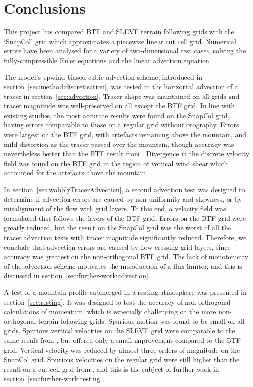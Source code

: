 \chapter{Conclusions}
\label{sec:conclusions}

This project has compared BTF and SLEVE terrain following grids with the `SnapCol' grid which approximates a piecewise linear cut cell grid.   Numerical errors have been analysed for a variety of two-dimensional test cases, solving the fully-compressible Euler equations and the linear advection equation.

The model's upwind-biased cubic advection scheme, introduced in section~\ref{sec:method:discretisation}, was tested in the horizontal advection of a tracer in section~\ref{sec:advection}.  Tracer shape was maintained on all grids and tracer magnitude was well-preserved on all except the BTF grid.  In line with existing studies, the most accurate results were found on the SnapCol grid, having errors comparable to those on a regular grid without orography.  Errors were largest on the BTF grid, with artefacts remaining above the mountain, and mild distortion as the tracer passed over the mountain, though accuracy was nevertheless better than the BTF result from \textcite{schaer2002}.  Divergence in the discrete velocity field was found on the BTF grid in the region of vertical wind shear which accounted for the artefacts above the mountain.

In section~\ref{sec:wobblyTracerAdvection}, a second advection test was designed to determine if advection errors are caused by non-uniformity and skewness, or by misalignment of the flow with grid layers.  To this end, a velocity field was formulated that follows the layers of the BTF grid.
Errors on the BTF grid were greatly reduced, but the result on the SnapCol grid was the worst of all the tracer advection tests with tracer magnitude significantly reduced.  Therefore, we conclude that advection errors are caused by flow crossing grid layers, since accuracy was greatest on the non-orthogonal BTF grid.  The lack of monotonicity of the advection scheme motivates the introduction of a flux limiter, and this is discussed in section~\ref{sec:further-work:advection}.

A test of a mountain profile submerged in a resting atmosphere was presented in section~\ref{sec:resting}.  It was designed to test the accuracy of non-orthogonal calculations of momentum, which is especially challenging on the more non-orthogonal terrain following grids.  Spurious motion was found to be small on all grids.  Spurious vertical velocities on the SLEVE grid were comparable to the same result from \textcite{schaer2002}, but offered only a small improvement compared to the BTF grid.  Vertical velocity was reduced by almost three orders of magnitude on the SnapCol grid.  Spurious velocities on the regular grid were still higher than the result on a cut cell grid from \textcite{good2013}, and this is the subject of further work in section~\ref{sec:further-work:resting}.

